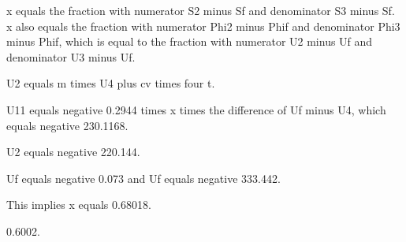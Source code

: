 x equals the fraction with numerator S2 minus Sf and denominator S3 minus Sf. x also equals the fraction with numerator Phi2 minus Phif and denominator Phi3 minus Phif, which is equal to the fraction with numerator U2 minus Uf and denominator U3 minus Uf.

U2 equals m times U4 plus cv times four t.

U11 equals negative 0.2944 times x times the difference of Uf minus U4, which equals negative 230.1168.

U2 equals negative 220.144.

Uf equals negative 0.073 and Uf equals negative 333.442.

This implies x equals 0.68018.

0.6002.